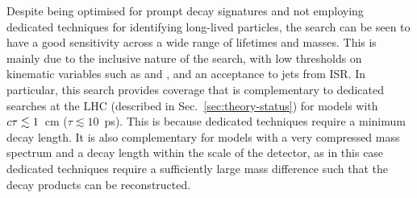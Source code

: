 Despite being optimised for prompt decay signatures and not employing dedicated 
techniques for identifying long-lived particles, the search can be seen to have 
a good sensitivity across a wide range of lifetimes and masses. This is mainly 
due to the inclusive nature of the search, with low thresholds on kinematic 
variables such as \scalht and \njet, and an acceptance to jets from ISR.
In particular, this search provides coverage that is complementary to dedicated 
searches at the LHC (described in Sec.~\ref{sec:theory-status}) for models with 
$c\tau \lesssim 1$~cm ($\tau \lesssim 10$~ps). This is because dedicated 
techniques require a minimum decay length. 
It is also complementary for models with a very compressed mass spectrum and a 
decay length within the scale of the detector, as in this case dedicated 
techniques require a sufficiently large mass difference such that the decay 
products can be reconstructed.



